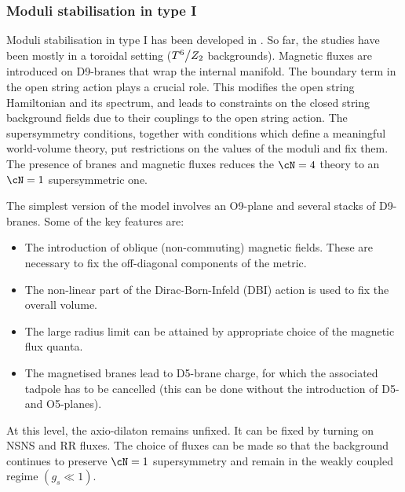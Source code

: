 \begin{itemize}
 


\end{itemize}
 
\subsubsection{Moduli stabilisation in type I}

Moduli stabilisation in type I has been developed in \cite{Antoniadis:2004pp, Antoniadis:2005nu, Antoniadis:2006eu, Kumar:2006er, Antoniadis:2007jq, Antoniadis:2009bg}. So far, the studies have been mostly in a toroidal setting ($T^{6} \big{/} Z_2$ backgrounds).
 Magnetic fluxes  are introduced  on D9-branes that wrap the internal manifold. The boundary term in the open string action 
plays a  crucial role. This modifies the open string Hamiltonian and its spectrum, and leads to constraints on the closed string background fields due to their couplings to the open string action.  The supersymmetry conditions, together with conditions which define a meaningful world-volume theory, put restrictions on the values of the moduli and fix them.  The presence of branes and magnetic fluxes reduces  the $\cN=4$ theory to  an $\cN = 1$ supersymmetric one.

 The simplest version of the model involves an O9-plane and several stacks of D9-branes. Some of the key features are:
 \begin{itemize}
 
 \item   The introduction of oblique (non-commuting) magnetic fields. These are necessary to fix the off-diagonal components of the metric.
 
 \item  The non-linear part of the Dirac-Born-Infeld (DBI) action is used to fix the overall volume.
 
 \item The large radius limit can be attained by appropriate choice of the magnetic flux quanta.
  
 \item The magnetised  branes  lead to D5-brane charge, for which the associated tadpole has to be cancelled (this can be done without
 the introduction of D5- and O5-planes).
  \end{itemize}

  At this level, the axio-dilaton remains unfixed.   It can be fixed by turning on NSNS and RR fluxes. The choice of fluxes can be made so that the background continues to preserve $\cN=1$ supersymmetry and remain in the weakly coupled regime $(g_s \ll 1)$. 

